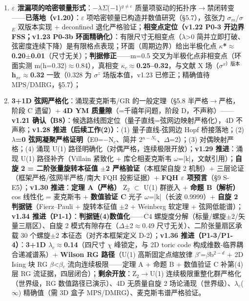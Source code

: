 \documentclass[12pt]{article}
\newcommand{\up}[1]{\ensuremath{^{#1}}}
\newcommand{\down}[1]{\ensuremath{_{#1}}}
\begin{document}
\begin{enumerate}
\item \textbf{\ensuremath{\varepsilon} 泄漏项的哈密顿量形式}：\ensuremath{-}\ensuremath{\lambda}\ensuremath{\Sigma}(\ensuremath{-}1)\up{g\neq{}e} 质量项驱动的拓扑序\ensuremath{\to}禁闭转变------\textbf{\checkmark 已落地（v1.20）}：\ensuremath{\varepsilon} 项哈密顿量已构造并数值研究（\S{}5.7），弦张力 \ensuremath{\sigma}\down{m}/\ensuremath{\sigma}\down{E} 双版本实现 + deconfined 退化严格验证；\textbf{\checkmark 相变点定位（v1.22 P0-3 开边界 FSS；v1.23 P0-3b 环面精确化）}：有限尺寸无相变点（\ensuremath{\lambda}>0 简并立即打破、弦密度连续下降）是有限格点表现；环面（周期边界）给出半极化点 \textbf{\ensuremath{\kappa}*\ensuremath{\approx}0.20\ensuremath{\pm}0.01}（尺寸无关）；\textbf{判据修正}------m=0.5 交叉为半极化点非相变点（环面实测 m(h=0.32)\ensuremath{\approx}0.84），真相变 \textbf{\ensuremath{\kappa}\down{c}\ensuremath{\approx}0.25--0.32}，与文献 X 场（\ensuremath{\sigma}\up{x）版本} \textbf{h\down{xc}\ensuremath{\approx}0.32} 一致（0.328 为 \ensuremath{\sigma}\up{z} 场版本值，v1.23 已修正；精确值待 MPS/DMRG，\S{}5.7）；
\item \textbf{3+1D 弦网严格化}：涌现麦克斯韦/GR 的一般定理（\S{}5.8 半严格\ensuremath{\to}严格，阶段 C 遗留）+ \textbf{4D YM 质量隙}（=千禧年问题，阶段 D，不声称）------\textbf{v1.21 确认（B8）}：候选路线图定位（量子直线=弦网边映射严格化），4D 不声称；\textbf{v1.28 推进（后续工作(2)）}：(1) 量子直线-弦网边 Hopf 桥接落地；(2) \textbf{\ensuremath{\lambda}=0 弦网凝聚严格证明}（E0=\ensuremath{-}N\down{c}、简并 2\up{n-N\down{c}}、\ensuremath{\Delta}=2）；(3) 对偶映射严格；(4) 涌现 U(1) 路径明确化（对偶严格，连续极限开放）；\textbf{v1.29 推进}：涌现 U(1) 路径补齐（Villain 紧致化 + 库仑相麦克斯韦 \ensuremath{\omega}=|k|，文献引用）；\textbf{自旋 2 = 二阶张量旋转本征值 \ensuremath{\pm}2 严格验证}（本框架自旋 2 机制）+ 三层论证（框架严格/弦网半严格/南大 FQH 投影证据）+ \textbf{FQH \ensuremath{\varepsilon} 项预言}（\S{}9 S-E5）；\textbf{v1.30 推进}：\textbf{定理 A（严格）} Z\down{2} \ensuremath{\subset} U(1) 群嵌入 + \textbf{命题 B（解析）} cos 线性化 = 麦克斯韦 + \textbf{数值验证 C} 光子 \ensuremath{\omega}=|k|（长波 0.9999）+ \textbf{自旋 2 判据链}（Fierz--Pauli + 旋转本征值 \ensuremath{\pm}2 + Weinberg 软定理 + 弦网低能谱）；\textbf{v1.34 推进（P1-1）}：\textbf{判据链(4)数值化}------C4 螺旋度分解（标量/螺旋\ensuremath{\pm}2/矢量三扇区）、自旋 2 模式有隙存在（\ensuremath{\Delta}\ensuremath{\pm}2\ensuremath{\approx}0.49 尺寸无关）、二阶张量扇区承载 30 个螺旋\ensuremath{\pm}2 本征态（对齐本框架定义 D-2）；\textbf{v1.36 推进（P1-3/P1-4）}：\textbf{3+1D \ensuremath{\lambda}\down{c}\ensuremath{\approx}0.14}（四尺寸 \ensuremath{\chi} 峰锁定，与 2D toric code 构成维数-临界耦合递减谱系）+ \textbf{Wilson RG 路径}（U(1) 高斯固定点缩放律 \ensuremath{\beta}'=\ensuremath{\beta}b\up{2-d} + 2D Ising 块 RG \ensuremath{\beta}<\ensuremath{\beta}\down{c} 流向连续极限------定理 A + 命题 B + 数值验证 C 补第(4)层 RG 流证据，四层闭合）；\textbf{剩余开放}：Z\down{2}\ensuremath{\to}U(1) 连续极限重整化群严格化（世界级，RG 数值路径已演示）、4D 无质量自旋 2 场论涌现（世界级）、\ensuremath{\lambda}\down{c}(\ensuremath{\infty}) 精确值（需 3D 盒子 MPS/DMRG）、麦克斯韦谱严格验证。
\end{enumerate}
\end{document}
